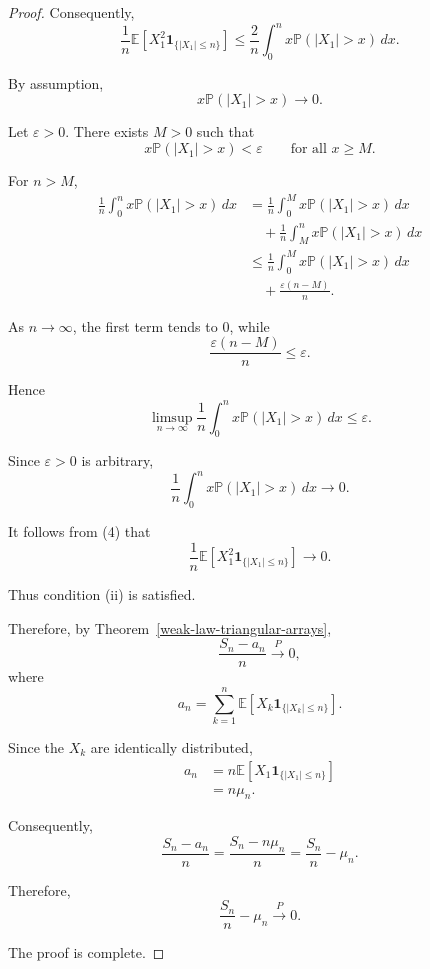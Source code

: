 \begin{proof}
Consequently,
\[
\frac1n
\mathbb{E}
\left[
X_1^2
\mathbf{1}_{\{|X_1|\leq n\}}
\right]
\leq
\frac2n
\int_0^n
x\mathbb{P}(|X_1|>x)\,dx.
\tag{4}
\]

By assumption,
\[
x\mathbb{P}(|X_1|>x)
\longrightarrow0.
\]

Let $\varepsilon>0$. There exists $M>0$ such that
\[
x\mathbb{P}(|X_1|>x)
<
\varepsilon
\qquad
\text{for all }x\geq M.
\]

For $n>M$,
\[
\begin{aligned}
\frac1n
\int_0^n
x\mathbb{P}(|X_1|>x)\,dx
&=
\frac1n
\int_0^M
x\mathbb{P}(|X_1|>x)\,dx\\
&\quad+
\frac1n
\int_M^n
x\mathbb{P}(|X_1|>x)\,dx\\
&\leq
\frac1n
\int_0^M
x\mathbb{P}(|X_1|>x)\,dx\\
&\quad+
\frac{\varepsilon(n-M)}{n}.
\end{aligned}
\]

As $n\to\infty$, the first term tends to $0$, while
\[
\frac{\varepsilon(n-M)}{n}
\leq\varepsilon.
\]

Hence
\[
\limsup_{n\to\infty}
\frac1n
\int_0^n
x\mathbb{P}(|X_1|>x)\,dx
\leq\varepsilon.
\]

Since $\varepsilon>0$ is arbitrary,
\[
\frac1n
\int_0^n
x\mathbb{P}(|X_1|>x)\,dx
\longrightarrow0.
\]

It follows from (4) that
\[
\frac1n
\mathbb{E}
\left[
X_1^2
\mathbf{1}_{\{|X_1|\leq n\}}
\right]
\longrightarrow0.
\]

Thus condition (ii) is satisfied.

\medskip

Therefore, by Theorem~\ref{weak-law-triangular-arrays},
\[
\frac{S_n-a_n}{n}
\xrightarrow{P}0,
\]
where
\[
a_n
=
\sum_{k=1}^n
\mathbb{E}
\left[
X_k
\mathbf{1}_{\{|X_k|\leq n\}}
\right].
\]

Since the $X_k$ are identically distributed,
\[
\begin{aligned}
a_n
&=
n
\mathbb{E}
\left[
X_1
\mathbf{1}_{\{|X_1|\leq n\}}
\right]\\
&=
n\mu_n.
\end{aligned}
\]

Consequently,
\[
\frac{S_n-a_n}{n}
=
\frac{S_n-n\mu_n}{n}
=
\frac{S_n}{n}-\mu_n.
\]

Therefore,
\[
\boxed{
\frac{S_n}{n}-\mu_n
\xrightarrow{P}0.
}
\]

The proof is complete.

\end{proof}


